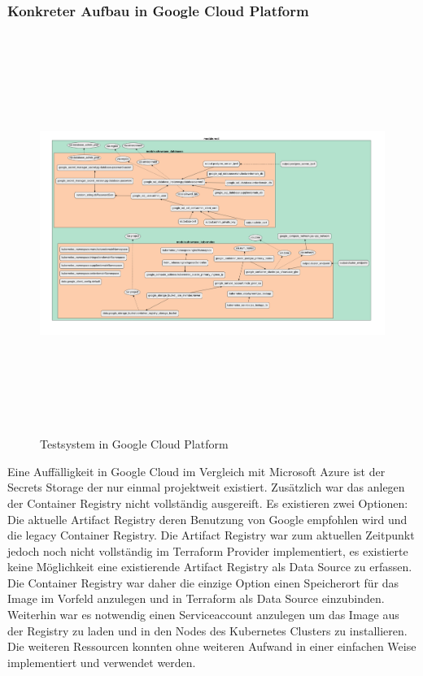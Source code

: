 \begin{spacing}{1.2}
\begin{landscape}
\subsubsection{Konkreter Aufbau in Google Cloud Platform}
\begin{figure}[H]
  \includegraphics[keepaspectratio, height=13cm]{fig/hauptteil/gcp-terraform-graph-beautifier.png}
  \caption{Testsystem in Google Cloud Platform}
  \centering
\end{figure}
\end{landscape}

Eine Auffälligkeit in Google Cloud im Vergleich mit Microsoft Azure
ist der Secrets Storage der nur einmal projektweit existiert.
Zusätzlich war das anlegen der Container Registry nicht vollständig
ausgereift. Es existieren zwei Optionen: Die aktuelle Artifact
Registry deren Benutzung von Google empfohlen wird und die legacy
Container Registry. Die Artifact Registry war zum aktuellen Zeitpunkt
jedoch noch nicht vollständig im Terraform Provider implementiert,
es existierte keine Möglichkeit eine existierende Artifact Registry
als Data Source zu erfassen. Die Container Registry war daher die
einzige Option einen Speicherort für das Image im Vorfeld anzulegen
und in Terraform als Data Source einzubinden.\\
Weiterhin war es notwendig einen Serviceaccount anzulegen um das
Image aus der Registry zu laden und in den Nodes des Kubernetes
Clusters zu installieren.\\
Die weiteren Ressourcen konnten ohne weiteren Aufwand in einer
einfachen Weise implementiert und verwendet werden.


\end{spacing}
